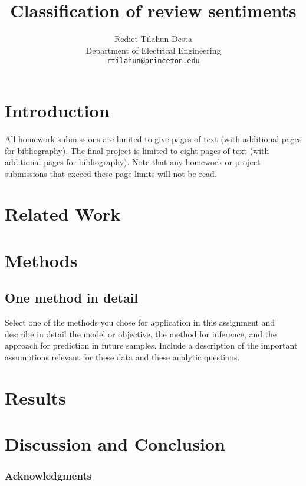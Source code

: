 \documentclass{article} %
\title{Classification of review sentiments}
\author{
Rediet Tilahun Desta\\
Department of Electrical Engineering\\
\texttt{rtilahun@princeton.edu} \\
}
\begin{document}
\maketitle

\begin{abstract}

\end{abstract}

\section{Introduction}

All homework submissions are limited to give pages of text (with additional pages for bibliography). The final project is limited to eight pages of text (with additional pages for bibliography). Note that any homework or project submissions that exceed these page limits will not be read.

\section{Related Work}

\section{Methods}

\subsection{One method in detail}

Select one of the methods you chose for application in this assignment and describe in detail the model or objective, the method for inference, and the approach for prediction in future samples. Include a description of the important assumptions relevant for these data and these analytic questions.

\section{Results}

\section{Discussion and Conclusion}

\subsubsection*{Acknowledgments}




\end{document}

